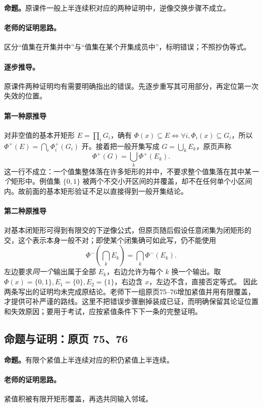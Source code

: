 \textbf{命题。}原课件一般上半连续积对应的两种证明中，逆像交换步骤不成立。

\paragraph{老师的证明思路。}区分“值集在开集并中”与“值集在某个开集成员中”，标明错误；不照抄伪等式。

\paragraph{逐步推导。}
原课件两种证明均有需要明确指出的错误。先逐步重写其可用部分，再定位第一次失效的位置。
\paragraph{第一种原推导}对非空值的基本开矩形 $E=\prod_iG_i$，确有 $\Phi(x)\subseteq E\iff\forall i,\Phi_i(x)\subseteq G_i$，所以 $\Phi^+(E)=\bigcap_i\Phi_i^+(G_i)$ 开。接着把一般开集写成 $G=\bigcup_kE_k$，原页声称
\[\Phi^+(G)=\bigcup_k\Phi^+(E_k).\]
这一行不成立：一个值集整体落在许多矩形的并中，不要求整个值集落在其中某\emph{一个}矩形中。例值集 $\{0,1\}$ 被两个不交小开区间的并覆盖，却不在任何单个小区间内。故前面的基本矩形验证不足以直接得到一般开集结论。
\paragraph{第二种原推导}对基本闭矩形可得到有限交的下逆像公式，但原页随后假设任意闭集为闭矩形的交，这个表示本身一般不对；即使某个闭集确可如此写，仍不能使用
\[\Phi^-(\bigcap_kE_k)=\bigcap_k\Phi^-(E_k).\]
左边要求\emph{同一个}输出属于全部 $E_k$，右边允许为每个 $k$ 换一个输出。取 $\Phi(x)=\{0,1\},E_1=\{0\},E_2=\{1\}$，右边含 $x$，左边不含，直接否定等式。
因此两条写出的证明均未完成原结论。老师下一组原页75--76增加紧值并用有限覆盖，才提供可补严谨的路线。这里不把错误步骤删掉装成已证，而明确保留其论证位置和失效原因；要用于考试，应按紧值条件下下一条的完整证明。


\subsection{命题与证明：原页 75、76}

\textbf{命题。}有限个紧值上半连续对应的积仍紧值上半连续。

\paragraph{老师的证明思路。}紧值积被有限开矩形覆盖，再选共同输入邻域。

